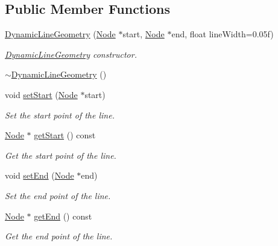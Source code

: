 \subsection*{Public Member Functions}
\begin{DoxyCompactItemize}
\item 
\mbox{\hyperlink{classec_1_1_dynamic_line_geometry_ade626d917fab310c550952b7086639bf}{Dynamic\+Line\+Geometry}} (\mbox{\hyperlink{classec_1_1_node}{Node}} $\ast$start, \mbox{\hyperlink{classec_1_1_node}{Node}} $\ast$end, float line\+Width=0.\+05f)
\begin{DoxyCompactList}\small\item\em \mbox{\hyperlink{classec_1_1_dynamic_line_geometry}{Dynamic\+Line\+Geometry}} constructor. \end{DoxyCompactList}\item 
\mbox{\hyperlink{classec_1_1_dynamic_line_geometry_aee42706b172e0e76cd290a4ae6897740}{$\sim$\+Dynamic\+Line\+Geometry}} ()
\item 
void \mbox{\hyperlink{classec_1_1_dynamic_line_geometry_a7354615fc961c1d6d6e9ec09bdb5bdf9}{set\+Start}} (\mbox{\hyperlink{classec_1_1_node}{Node}} $\ast$start)
\begin{DoxyCompactList}\small\item\em Set the start point of the line. \end{DoxyCompactList}\item 
\mbox{\hyperlink{classec_1_1_node}{Node}} $\ast$ \mbox{\hyperlink{classec_1_1_dynamic_line_geometry_a84dfd0f92891d7030790976be8606d98}{get\+Start}} () const
\begin{DoxyCompactList}\small\item\em Get the start point of the line. \end{DoxyCompactList}\item 
void \mbox{\hyperlink{classec_1_1_dynamic_line_geometry_a95e48c0fcda2b81310f99b0dc113701b}{set\+End}} (\mbox{\hyperlink{classec_1_1_node}{Node}} $\ast$end)
\begin{DoxyCompactList}\small\item\em Set the end point of the line. \end{DoxyCompactList}\item 
\mbox{\hyperlink{classec_1_1_node}{Node}} $\ast$ \mbox{\hyperlink{classec_1_1_dynamic_line_geometry_a877ec687c19743cc67520b5a419bad74}{get\+End}} () const
\begin{DoxyCompactList}\small\item\em Get the end point of the line. \end{DoxyCompactList}\item 

\end{DoxyCompactItemize}
